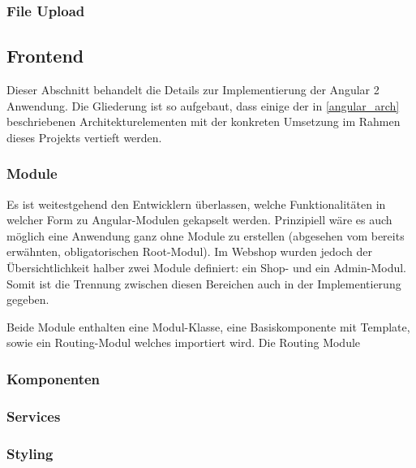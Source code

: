 \subsubsection{File Upload}


\subsection{Frontend}
Dieser Abschnitt behandelt die Details zur Implementierung der Angular 2 Anwendung. Die Gliederung ist so aufgebaut, dass einige der in \cref{angular_arch} beschriebenen   Architekturelementen mit der konkreten Umsetzung im Rahmen dieses Projekts vertieft werden.

\subsubsection{Module}
Es ist weitestgehend den Entwicklern überlassen, welche Funktionalitäten in welcher Form zu Angular-Modulen gekapselt werden. Prinzipiell wäre es auch möglich eine Anwendung ganz ohne Module zu erstellen (abgesehen vom bereits erwähnten, obligatorischen Root-Modul). Im Webshop wurden jedoch der Übersichtlichkeit halber zwei Module definiert: ein Shop- und ein Admin-Modul. Somit ist die Trennung zwischen diesen Bereichen auch in der Implementierung gegeben.

Beide Module enthalten eine Modul-Klasse, eine Basiskomponente mit Template, sowie ein Routing-Modul welches importiert wird. Die Routing Module


\subsubsection{Komponenten}

\subsubsection{Services}

\subsubsection{Styling}
